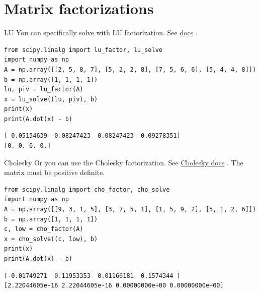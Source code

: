 \documentclass[xcolor=svgnames,t,10pt,allowframebreaks]{beamer}
\begin{document}
\section{Matrix factorizations}
\label{sec:orgec72e6c}
\begin{frame}[fragile,label={sec:org50a5e5b}]{LU}
 You can specifically solve with LU factorization. See \href{https://docs.scipy.org/doc/scipy/reference/generated/scipy.linalg.lu\_solve.html\#scipy.linalg.lu\_solve}{docs} .
\begin{verbatim}
from scipy.linalg import lu_factor, lu_solve
import numpy as np
A = np.array([[2, 5, 8, 7], [5, 2, 2, 8], [7, 5, 6, 6], [5, 4, 4, 8]])
b = np.array([1, 1, 1, 1])
lu, piv = lu_factor(A)
x = lu_solve((lu, piv), b)
print(x)
print(A.dot(x) - b)
\end{verbatim}

\begin{verbatim}
[ 0.05154639 -0.08247423  0.08247423  0.09278351]
[0. 0. 0. 0.]
\end{verbatim}
\end{frame}
\begin{frame}[fragile,label={sec:orga2f8aa5}]{Cholesky}
 Or you can use the Cholesky factorization. 
See \href{https://docs.scipy.org/doc/scipy/reference/generated/scipy.linalg.cho\_solve.html\#scipy.linalg.cho\_solve}{Cholesky docs} . The matrix must be positive definite. 
\begin{verbatim}
from scipy.linalg import cho_factor, cho_solve
import numpy as np
A = np.array([[9, 3, 1, 5], [3, 7, 5, 1], [1, 5, 9, 2], [5, 1, 2, 6]])
b = np.array([1, 1, 1, 1])
c, low = cho_factor(A)
x = cho_solve((c, low), b)
print(x)
print(A.dot(x) - b)
\end{verbatim}

\begin{verbatim}
[-0.01749271  0.11953353  0.01166181  0.1574344 ]
[2.22044605e-16 2.22044605e-16 0.00000000e+00 0.00000000e+00]
\end{verbatim}
\end{frame}

\begin{frame}[standout,label=]{}
\end{frame}
\end{document}
